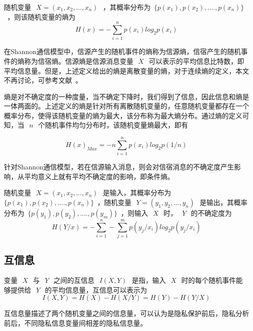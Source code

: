 \begin{definition}
随机变量~$~X=(x_1,x_2,...,x_n)~$~，其概率分布为~$\{p(x_1),p(x_2),....,p(x_n)\}$~，则该随机变量的熵为
\begin{equation}
H(x)=-\sum_{i=1}^{n}p(x_i)log_2p(x_i)
\end{equation}
\end{definition}
在Shannon通信模型中，信源产生的随机事件的熵称为信源熵，信宿产生的随机事件的熵称为信宿熵。信源熵是信源消息变量~$~X~$~可以表示的平均信息比特数，即平均信息量。但是，上述定义给出的熵是离散变量的熵，对于连续熵的定义，本文不再讨论，可参考文献~\cite{stone2018information}。

熵是对不确定度的一种度量，当不确定下降时，我们得到了信息，因此信息和熵是一体两面的。上述定义的熵是针对所有离散随机变量的，任意随机变量都存在一个概率分布，使得该随机变量的熵为最大，该分布称为最大熵分布。通过熵的定义可知，当~$~n~$~个随机事件均匀分布时，该随机变量熵最大，即有

\begin{equation}
H(x)_{Max}=-n\sum_{i=1}^{n}p(x_i)log_2p(1/n)
\end{equation}


针对Shannon通信模型，若在信源输入消息，则会对信宿消息的不确定度产生影响，从平均意义上就有平均不确定度的影响，即条件熵。

\begin{definition}
	随机变量~$~X=(x_1,x_2,...,x_n)~$~是输入，其概率分布为~$\{p(x_1),p(x_2),....,p(x_n)\}$~，随机变量~$~Y=(y_1,y_2,...,y_n)~$~是输出，其概率分布为~$\{p(y_1),p(y_2),....,p(y_m)\}$~，则输入~$~X~$~时，~$~Y~$~的不确定度为
	\begin{equation}
	H(Y/x)=-\sum_{i=1}^{n}-\sum_{j=1}^{m}p(y_j/x_i)log_2p(y_j/x_i)
	\end{equation}
\end{definition}


\subsection{互信息}

\begin{definition}
变量~$~X~$~与~$~Y~$~之间的互信息~$~I(X,Y)~$~是指，输入~$~X~$~时的每个随机事件能够提供给~$~Y~$~的平均信息量，互信息可以表示为
\begin{equation}
I(X,Y)=H(X)-H(X/Y)=H(Y)-H(Y/X)
\end{equation}
\end{definition}

互信息量描述了两个随机变量之间的信息量，可以认为是隐私保护前后，隐私分析前后，不同隐私信息变量间相差的隐私信息量。


